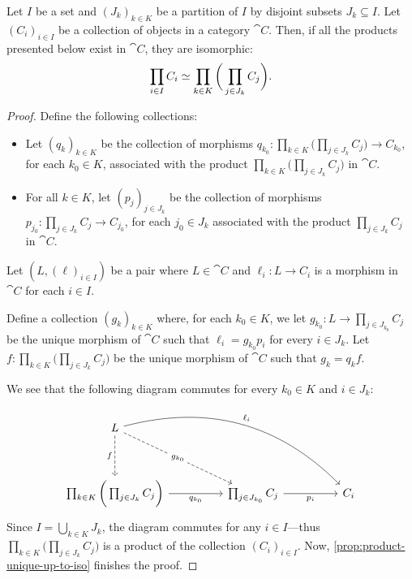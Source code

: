 \begin{proposition}
    \label{prop:product-ordering-independent}
    Let \(I\) be a set and \((J_k)_{k \in K}\) be a partition of \(I\) by disjoint
    subsets \(J_k \subseteq I\). Let \((C_i)_{i \in I}\) be a collection of objects
    in a category \(\cat C\). Then, if all the products presented below exist in
    \(\cat C\), they are isomorphic:
    \[
        \prod_{i \in I} C_i \simeq \prod_{k \in K} \bigg(\prod_{j \in J_k} C_j \bigg).
    \]
\end{proposition}

\begin{proof}
    Define the following collections:
    \begin{itemize}\setlength\itemsep{0em}
        \item Let \((q_k)_{k \in K}\) be the collection of morphisms
              \(q_{k_0}: \prod_{k \in K} \bigg( \prod_{j \in J_k} C_j \bigg) \to C_{k_0}\),
              for each \(k_0 \in K\), associated with the product
              \(\prod_{k \in K} \bigg( \prod_{j \in J_k} C_j \bigg)\) in \(\cat C\).

        \item For all \(k \in K\), let \((p_j)_{j \in J_k}\) be the collection of
              morphisms \(p_{j_0}: \prod_{j \in J_k} C_j \to C_{j_0}\), for each
              \(j_0 \in J_k\) associated with the product \(\prod_{j \in J_k} C_j\) in
              \(\cat C\).
    \end{itemize}
    Let \((L, (\ell)_{i \in I})\) be a pair where \(L \in \cat C\) and
    \(\ell_i: L \to C_i\) is a morphism in \(\cat C\) for each \(i \in I\).

    Define a collection \((g_k)_{k \in K}\) where, for each \(k_0 \in K\), we let
    \(g_{k_0}: L \to \prod_{j \in J_{k_0}} C_j\) be the unique morphism of
    \(\cat C\) such that \(\ell_i = g_{k_0} p_i\) for every \(i \in J_k\). Let
    \(f: \prod_{k \in K} \bigg( \prod_{j \in J_k} C_j \bigg)\) be the unique
    morphism of \(\cat C\) such that \(g_k = q_k f\).

    We see that the following diagram commutes for every \(k_0 \in K\) and
    \(i \in J_k\):
    \[
        \begin{tikzcd}
            L \ar[rrrrdd, bend left, "\ell_i"]
            \ar[dd, dashed, "f"']
            \ar[rrdd, dashed, "g_{k_0}" description]
            & & & &\\ & & & & \\
            \prod_{k \in K} \bigg( \prod_{j \in J_k} C_j \bigg)
            \ar[rr, "q_{k_0}"']
            &
            &\prod_{j \in J_{k_0}} C_j \ar[rr, "p_i"']
            &
            &C_i
        \end{tikzcd}
    \]
    Since \(I = \bigcup_{k \in K} J_k\), the diagram commutes for any
    \(i \in I\)---thus \(\prod_{k \in K} \bigg( \prod_{j \in J_k} C_j \bigg)\) is a
    product of the collection \((C_i)_{i \in I}\). Now,
    \cref{prop:product-unique-up-to-iso} finishes the proof.
\end{proof}

